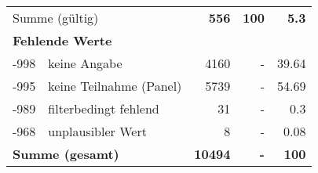 \begin{longtable}{lXrrr}
     \midrule
     \multicolumn{2}{l}{Summe (gültig)} &
       \textbf{\num{556}} &
     \textbf{\num{100}} &
       \textbf{\num[round-mode=places,round-precision=2]{5.3}} \\
     \multicolumn{5}{l}{\textbf{Fehlende Werte}}\\
       -998 &
       keine Angabe &
         \num{4160} &
        - &
         \num[round-mode=places,round-precision=2]{39.64} \\
       -995 &
       keine Teilnahme (Panel) &
         \num{5739} &
        - &
         \num[round-mode=places,round-precision=2]{54.69} \\
       -989 &
       filterbedingt fehlend &
         \num{31} &
        - &
         \num[round-mode=places,round-precision=2]{0.3} \\
       -968 &
       unplausibler Wert &
         \num{8} &
        - &
         \num[round-mode=places,round-precision=2]{0.08} \\
     \midrule
     \multicolumn{2}{l}{\textbf{Summe (gesamt)}} &
          \textbf{\num{10494}} &
        \textbf{-} &
        \textbf{\num{100}} \\
     \bottomrule
     \end{longtable}
     
